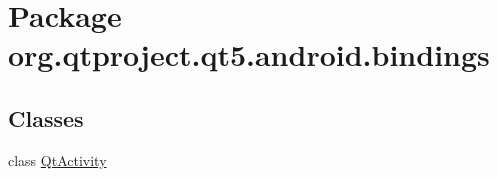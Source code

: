 \hypertarget{namespaceorg_1_1qtproject_1_1qt5_1_1android_1_1bindings}{\section{Package org.\+qtproject.\+qt5.\+android.\+bindings}
\label{namespaceorg_1_1qtproject_1_1qt5_1_1android_1_1bindings}
}
\subsection*{Classes}
\begin{DoxyCompactItemize}
\item 
class \hyperlink{classorg_1_1qtproject_1_1qt5_1_1android_1_1bindings_1_1_qt_activity}{Qt\+Activity}
\end{DoxyCompactItemize}
